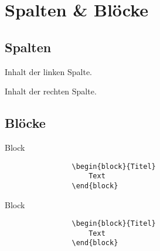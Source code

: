 \section{Spalten \& Blöcke}

	\subsection{Spalten}
	\begin{frame}{\subsecname}

		\begin{minipage}[t]{0.5\textwidth}
			\par\medskip
			Inhalt der linken Spalte.
		\end{minipage}%
		\begin{minipage}[t]{0.5\textwidth}
			\par\medskip
			Inhalt der rechten Spalte.
		\end{minipage}

	\end{frame}

	\subsection{Blöcke}
	\begin{frame}[fragile]{\subsecname}

		\begin{block}{Block}
			\begin{lstlisting}
				\begin{block}{Titel}
					Text
				\end{block}
			\end{lstlisting}
		\end{block}

		\begin{block}{Block}
			\begin{lstlisting}
				\begin{block}{Titel}
					Text
				\end{block}
			\end{lstlisting}
		\end{block}

	\end{frame}

